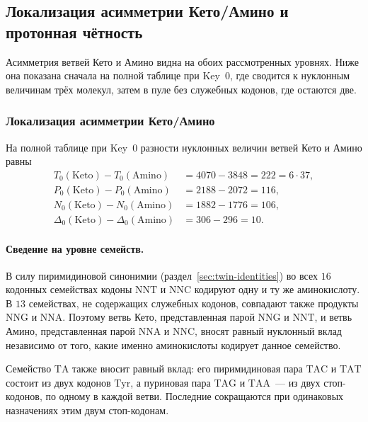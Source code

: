 \documentclass[11pt,a4paper]{article}
\renewcommand{\_}{\origunderscore\allowbreak}
\begin{document}
\subsection{Локализация асимметрии Кето/Амино и протонная чётность}
\label{sec:results-localization}

Асимметрия ветвей Кето и Амино видна на обоих рассмотренных уровнях.
Ниже она показана сначала на полной таблице при Key~0, где сводится к
нуклонным величинам трёх молекул, затем в пуле без служебных кодонов,
где остаются две.

\subsubsection{Локализация асимметрии Кето/Амино}
\label{sec:results-key1-trpile}

На полной таблице при Key~0 разности нуклонных величин ветвей Кето и
Амино равны
\[
\begin{aligned}
T_{0}(\mathrm{Keto}) - T_{0}(\mathrm{Amino})
  &= 4070 - 3848 = 222 = 6 \cdot 37, \\
P_{0}(\mathrm{Keto}) - P_{0}(\mathrm{Amino})
  &= 2188 - 2072 = 116, \\
N_{0}(\mathrm{Keto}) - N_{0}(\mathrm{Amino})
  &= 1882 - 1776 = 106, \\
\Delta_{0}(\mathrm{Keto}) - \Delta_{0}(\mathrm{Amino})
  &= 306 - 296 = 10.
\end{aligned}
\]

\paragraph{Сведение на уровне семейств.}
В силу пиримидиновой синонимии
(раздел~\ref{sec:twin-identities}) во всех $16$ кодонных семействах
кодоны $\mathrm{NNT}$ и $\mathrm{NNC}$ кодируют одну и ту же
аминокислоту. В $13$ семействах, не содержащих служебных кодонов,
совпадают также продукты $\mathrm{NNG}$ и $\mathrm{NNA}$. Поэтому
ветвь Кето, представленная парой $\mathrm{NNG}$ и $\mathrm{NNT}$,
и ветвь Амино, представленная парой $\mathrm{NNA}$ и
$\mathrm{NNC}$, вносят равный нуклонный вклад независимо от того,
какие именно аминокислоты кодирует данное семейство.

Семейство $\mathrm{TA}$ также вносит равный вклад: его
пиримидиновая пара $\mathrm{TAC}$ и $\mathrm{TAT}$ состоит из
двух кодонов $\mathrm{Tyr}$, а пуриновая пара $\mathrm{TAG}$ и
$\mathrm{TAA}$~--- из двух стоп-кодонов, по одному в каждой
ветви. Последние сокращаются при одинаковых назначениях
этим двум стоп-кодонам.
\end{document}
